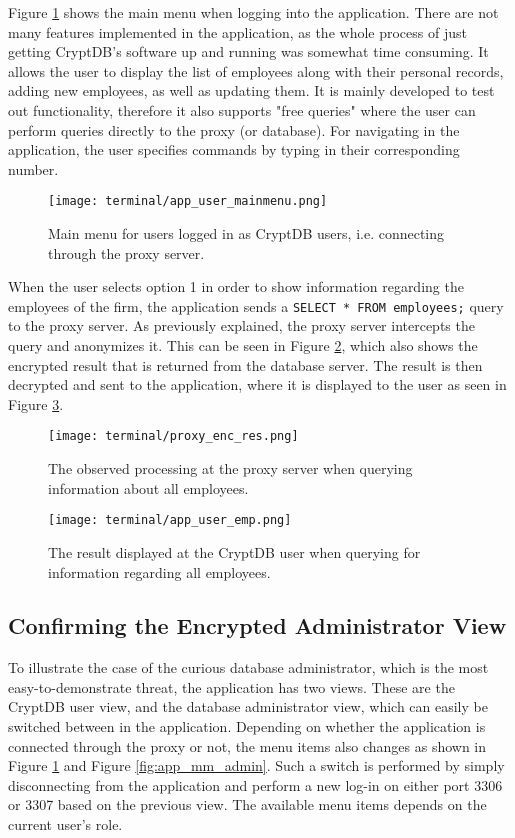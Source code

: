 Figure \ref{fig:app_mm_user} shows the main menu when logging into the application. There are not many features implemented in the application, as the whole process of just getting CryptDB's software up and running was somewhat time consuming. It allows the user to display the list of employees along with their personal records, adding new employees, as well as updating them. It is mainly developed to test out functionality, therefore it also supports "free queries" where the user can perform queries directly to the proxy (or database). For navigating in the application, the user specifies commands by typing in their corresponding number.
\newpage
\begin{figure}[h]
	\centering
	\texttt{[image: terminal/app\_user\_mainmenu.png]}
	\caption{Main menu for users logged in as CryptDB users, i.e. connecting through the proxy server.}
	\label{fig:app_mm_user}
\end{figure}

When the user selects option 1 in order to show information regarding the employees of the firm, the application sends a \verb!SELECT * FROM employees;! query to the proxy server. As previously explained, the proxy server intercepts the query and anonymizes it. This can be seen in Figure \ref{fig:proxy_enc_res}, which also shows the encrypted result that is returned from the database server. The result is then decrypted and sent to the application, where it is displayed to the user as seen in Figure \ref{fig:app_user_emp}.

\begin{figure}[h]
	\centering
	\texttt{[image: terminal/proxy\_enc\_res.png]}
	\caption{The observed processing at the proxy server when querying information about all employees.}
	\label{fig:proxy_enc_res}
\end{figure}


\begin{figure}[h]
	\centering
	\texttt{[image: terminal/app\_user\_emp.png]}
	\caption{The result displayed at the CryptDB user when querying for information regarding all employees.}
	\label{fig:app_user_emp}
\end{figure}

\newpage

\subsection{Confirming the Encrypted Administrator View}

To illustrate the case of the curious database administrator, which is the most easy-to-demonstrate threat, the application has two views. These are the CryptDB user view, and the database administrator view, which can easily be switched between in the application. Depending on whether the application is connected through the proxy or not, the menu items also changes as shown in Figure \ref{fig:app_mm_user} and Figure \ref{fig:app_mm_admin}. Such a switch is performed by simply disconnecting from the application and perform a new log-in on either port 3306 or 3307 based on the previous view. The available menu items depends on the current user's role.

